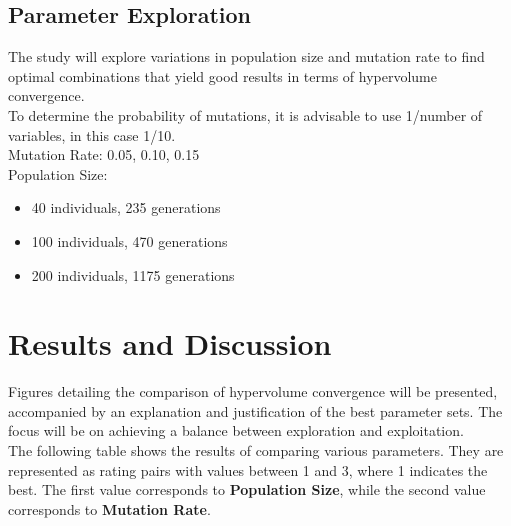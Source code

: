 \documentclass{article}
\begin{document}
\subsection{Parameter Exploration}
The study will explore variations in population size and mutation rate to find optimal combinations that yield good results in terms of hypervolume convergence.\\
To determine the probability of mutations, it is advisable to use 1/number of variables, in this case 1/10.\\

Mutation Rate: 0.05, 0.10, 0.15\\

Population Size:
\begin{itemize}
    \item 40 individuals, 235 generations
    \item 100 individuals, 470 generations
    \item 200 individuals, 1175 generations
\end{itemize}

\section{Results and Discussion}
Figures detailing the comparison of hypervolume convergence will be presented, accompanied by an explanation and justification of the best parameter sets. The focus will be on achieving a balance between exploration and exploitation. \\
The following table shows the results of comparing various parameters. They are represented as rating pairs with values between 1 and 3, where 1 indicates the best. The first value corresponds to \textbf{Population Size}, while the second value corresponds to \textbf{Mutation Rate}.\\
\newpage
\end{document}
